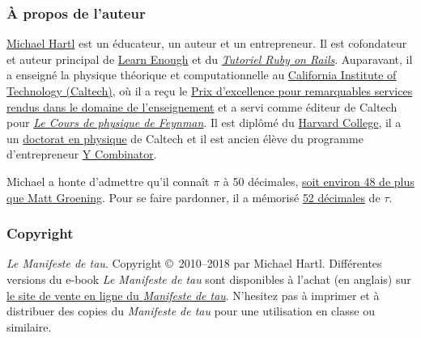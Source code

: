 
    \subsubsection{À propos de l'auteur} %
    \label{sec:about_the_author}


\href{https://translate.google.com/translate?hl=en&sl=en&tl=fr&u=https://www.michaelhartl.com/}{Michael
Hartl} est un éducateur, un auteur
et un entrepreneur. Il est cofondateur et auteur principal de
\href{https://www.learnenough.com/}{Learn Enough} et du
\href{https://www.railstutorial.org/}{\emph{Tutoriel Ruby on Rails}}.
Auparavant, il a enseigné la physique théorique et computationnelle au
\href{https://www.caltech.edu/}{California Institute of Technology (Caltech)},
où il a reçu le
\href{https://translate.google.com/translate?hl=en&sl=en&tl=fr&u=https://www.michaelhartl.com/ascit/awards2000.html}{Prix
d'excellence pour remarquables services rendus dans le domaine de l'enseignement} et a servi comme éditeur de Caltech pour
\href{https://translate.google.com/translate?hl=en&sl=en&tl=fr&u=https://www.feynmanlectures.caltech.edu/}{\emph{Le
Cours de physique de
Feynman}}. Il est diplômé du \href{https://college.harvard.edu/}{Harvard
College}, il a un \href{https://translate.google.com/translate?hl=en&sl=en&tl=fr&u=https://thesis.library.caltech.edu/1940/}{doctorat
en
physique} de Caltech et il est ancien élève du programme d'entrepreneur
\href{https://ycombinator.com/}{Y Combinator}.

Michael a honte d'admettre qu'il connaît $\pi$ à 50 décimales,
\href{\#fig-futurama_video}{soit environ 48 de plus que Matt Groening}. Pour
se faire pardonner, il a mémorisé
\href{https://www.wolframalpha.com/input/?i=N[2+Pi,+53]}{52 décimales} de
$\tau$.

    \subsubsection{Copyright} %
    \label{sec:copyright_and_license}

    \emph{Le Manifeste de tau}. Copyright \copyright\ 2010--2018 par Michael
	Hartl. Différentes versions du e-book \emph{Le Manifeste de tau} sont
	disponibles à l'achat (en anglais) sur \href{https://sales.tauday.com/}{le site de vente en ligne
  du \emph{Manifeste de tau}}.
	N'hesitez pas à imprimer et à distribuer des copies du \emph{Manifeste de
	tau} pour une utilisation en classe ou similaire.

